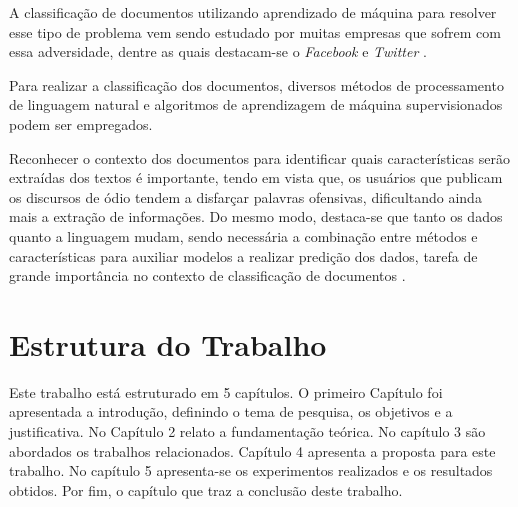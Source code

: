 A classificação de documentos utilizando aprendizado de máquina para resolver esse tipo de problema vem sendo estudado por muitas empresas que sofrem com essa adversidade, dentre as quais destacam-se o \textit{Facebook} e \textit{Twitter} \cite{nobata2016abusive}.

Para realizar a classificação dos documentos, diversos métodos de processamento de linguagem natural e algoritmos de aprendizagem de máquina supervisionados podem ser empregados. 

Reconhecer o contexto dos documentos para identificar quais características serão extraídas dos textos é importante, tendo em vista que, os usuários que publicam os discursos de ódio tendem a disfarçar palavras ofensivas, dificultando ainda mais a extração de informações. Do mesmo modo, destaca-se que tanto os dados quanto a linguagem mudam, sendo necessária a combinação entre métodos e características para auxiliar modelos a realizar predição dos dados, tarefa de grande importância no contexto de classificação de documentos \cite{nobata2016abusive}. 

\section{Estrutura do Trabalho}

Este trabalho está estruturado em 5 capítulos. O primeiro Capítulo foi apresentada a introdução, definindo o tema de pesquisa, os objetivos e a justificativa. No Capítulo 2 relato a fundamentação teórica. No capítulo 3 são abordados os trabalhos relacionados. Capítulo 4 apresenta a proposta para este trabalho. No capítulo 5 apresenta-se os experimentos realizados e os resultados obtidos. Por fim, o capítulo que traz a conclusão deste trabalho.